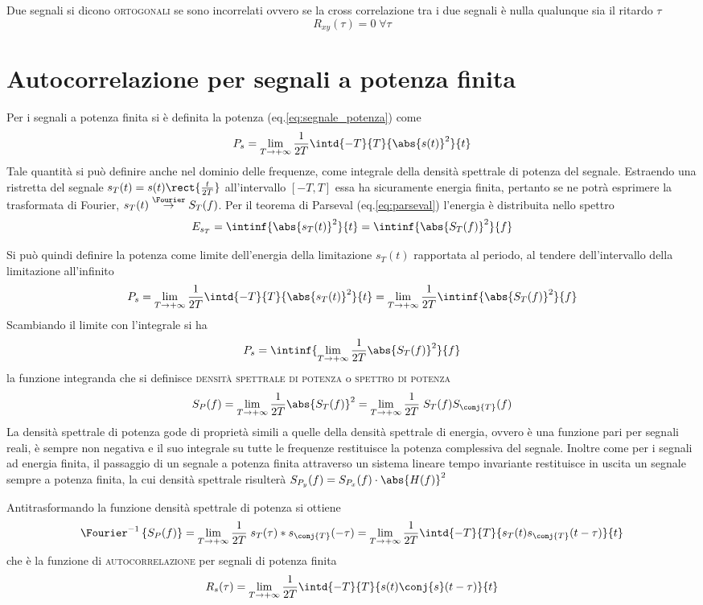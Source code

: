 Due segnali si dicono \textsc{ortogonali} se sono incorrelati ovvero se la cross correlazione tra i due segnali è nulla qualunque sia il ritardo $\tau$
\[
	R_{xy}(\tau)=0\;\forall\tau
\]

\section{Autocorrelazione per segnali a potenza finita}
Per i segnali a potenza finita si è definita la potenza (eq.\ref{eq:segnale_potenza}) come
\[
	P_s=\lim\limits_{T\to+\infty}{\frac{1}{2T}\intd{-T}{T}{\abs{s(t)}^2}{t}}
\]
Tale quantità si può definire anche nel dominio delle frequenze, come integrale della densità spettrale di potenza del segnale. Estraendo una ristretta del segnale $s_T(t)=s(t)\rect{\frac{t}{2T}}$ all'intervallo $[-T,T]$ essa ha sicuramente energia finita, pertanto se ne potrà esprimere la trasformata di Fourier, $s_T(t)\overset{\Fourier}{\to}S_T(f)$. Per il teorema di Parseval (eq.\ref{eq:parseval}) l'energia è distribuita nello spettro
\[
	E_{s_T}=\intinf{\abs{s_T(t)}^2}{t}=\intinf{\abs{S_T(f)}^2}{f}
\]

Si può quindi definire la potenza come limite dell'energia della limitazione $s_T(t)$ rapportata al periodo, al tendere dell'intervallo della limitazione all'infinito
\[
	P_s=\lim\limits_{T\to+\infty}{\frac{1}{2T}\intd{-T}{T}{\abs{s_T(t)}^2}{t}}=\lim\limits_{T\to+\infty}{\frac{1}{2T}\intinf{\abs{S_T(f)}^2}{f}}
\]
Scambiando il limite con l'integrale si ha
\[
	P_s=\intinf{\lim\limits_{T\to+\infty}\frac{1}{2T}\abs{S_T(f)}^2}{f}
\]
la funzione integranda che si definisce \textsc{densità spettrale di potenza} o \textsc{spettro di potenza}
\begin{equation}
	S_P(f)=\lim\limits_{T\to+\infty}{\frac{1}{2T}\abs{S_T(f)}^2}=\lim\limits_{T\to+\infty}{\frac{1}{2T}\;S_T(f)S_\conj{T}(f)}
\end{equation}
La densità spettrale di potenza gode di proprietà simili a quelle della densità spettrale di energia, ovvero è una funzione pari per segnali reali, è sempre non negativa e il suo integrale su tutte le frequenze restituisce la potenza complessiva del segnale.
Inoltre come per i segnali ad energia finita, il passaggio di un segnale a potenza finita attraverso un sistema lineare tempo invariante restituisce in uscita un segnale sempre a potenza finita, la cui densità spettrale risulterà $S_{P_y}(f)=S_{P_x}(f)\cdot\abs{H(f)}^2$

Antitrasformando la funzione densità spettrale di potenza si ottiene
\[
	\Fourier^{-1}\left\lbrace{S_P(f)}\right\rbrace=\lim\limits_{T\to+\infty}{\frac{1}{2T}\;s_T(\tau)\ast s_\conj{T}(-\tau)}=\lim\limits_{T\to+\infty}{\frac{1}{2T}\intd{-T}{T}{s_T(t)s_\conj{T}(t-\tau)}{t}}
\]
che è la funzione di \textsc{autocorrelazione} per segnali di potenza finita
\begin{equation}
	R_s(\tau)=\lim\limits_{T\to+\infty}{\frac{1}{2T}\intd{-T}{T}{s(t)\conj{s}(t-\tau)}{t}}
\end{equation}

